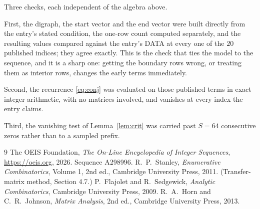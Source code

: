 \documentclass[11pt,a4paper]{article}
\theoremstyle{plain}
\theoremstyle{definition}
\begin{document}
Three checks, each independent of the algebra above.

First, the digraph, the start vector and the end vector were built directly from the
entry's stated condition, the one-row count computed separately, and the resulting values
compared against the entry's DATA at every one of the $20$ published indices; they
agree exactly. This is the check that ties the model to the sequence, and it is a sharp one:
getting the boundary rows wrong, or treating them as interior rows, changes the early terms
immediately.

Second, the recurrence \eqref{eq:conj} was evaluated on those published terms in exact
integer arithmetic, with no matrices involved, and vanishes at every index the entry claims.

Third, the vanishing test of Lemma~\ref{lem:crit} was carried past $S=64$ consecutive
zeros rather than to a sampled prefix.

\begin{thebibliography}{9}
 The OEIS Foundation, \emph{The On-Line Encyclopedia of Integer
Sequences}, \url{https://oeis.org}, 2026. Sequence A298996.
 R.~P.~Stanley, \emph{Enumerative Combinatorics}, Volume 1, 2nd ed.,
Cambridge University Press, 2011. (Transfer-matrix method, Section 4.7.)
 P.~Flajolet and R.~Sedgewick, \emph{Analytic Combinatorics}, Cambridge
University Press, 2009.
 R.~A.~Horn and C.~R.~Johnson, \emph{Matrix Analysis}, 2nd ed., Cambridge
University Press, 2013.
\end{thebibliography}
\end{document}
